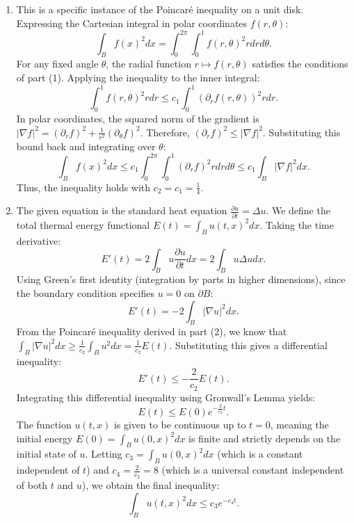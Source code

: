 \documentclass[10pt,a4paper]{article}
\begin{document}
\begin{enumerate}[label=\fbox{\arabic*}]
\begin{enumerate}[label=(\arabic*)]
          \item This is a specific instance of the Poincaré inequality on a unit disk. Expressing the Cartesian integral in polar coordinates $f(r, \theta)$:
          \[
            \int_B f(x)^2 dx = \int_0^{2\pi} \int_0^1 f(r, \theta)^2 r dr d\theta.
          \]
          For any fixed angle $\theta$, the radial function $r \mapsto f(r, \theta)$ satisfies the conditions of part (1). Applying the inequality to the inner integral:
          \[
            \int_0^1 f(r, \theta)^2 r dr \le c_1 \int_0^1 (\partial_r f(r, \theta))^2 r dr.
          \]
          In polar coordinates, the squared norm of the gradient is $|\nabla f|^2 = (\partial_r f)^2 + \frac{1}{r^2}(\partial_\theta f)^2$. Therefore, $(\partial_r f)^2 \le |\nabla f|^2$.
          Substituting this bound back and integrating over $\theta$:
          \[
            \int_B f(x)^2 dx \le c_1 \int_0^{2\pi} \int_0^1 (\partial_r f)^2 r dr d\theta \le c_1 \int_B |\nabla f|^2 dx.
          \]
          Thus, the inequality holds with $c_2 = c_1 = \frac{1}{4}$.

          \item The given equation is the standard heat equation $\frac{\partial u}{\partial t} = \Delta u$. We define the total thermal energy functional $E(t) = \int_B u(t, x)^2 dx$. Taking the time derivative:
          \[
            E'(t) = 2 \int_B u \frac{\partial u}{\partial t} dx = 2 \int_B u \Delta u dx.
          \]
          Using Green's first identity (integration by parts in higher dimensions), since the boundary condition specifies $u = 0$ on $\partial B$:
          \[
            E'(t) = -2 \int_B |\nabla u|^2 dx.
          \]
          From the Poincaré inequality derived in part (2), we know that $\int_B |\nabla u|^2 dx \ge \frac{1}{c_2} \int_B u^2 dx = \frac{1}{c_2} E(t)$. Substituting this gives a differential inequality:
          \[
            E'(t) \le -\frac{2}{c_2} E(t).
          \]
          Integrating this differential inequality using Gronwall's Lemma yields:
          \[
            E(t) \le E(0) e^{-\frac{2}{c_2} t}.
          \]
          The function $u(t, x)$ is given to be continuous up to $t=0$, meaning the initial energy $E(0) = \int_B u(0, x)^2 dx$ is finite and strictly depends on the initial state of $u$. Letting $c_3 = \int_B u(0, x)^2 dx$ (which is a constant independent of $t$) and $c_4 = \frac{2}{c_2} = 8$ (which is a universal constant independent of both $t$ and $u$), we obtain the final inequality:
          \[
            \int_B u(t, x)^2 dx \le c_3 e^{-c_4 t}.
          \]
        \end{enumerate}


\end{enumerate}
\end{document}
